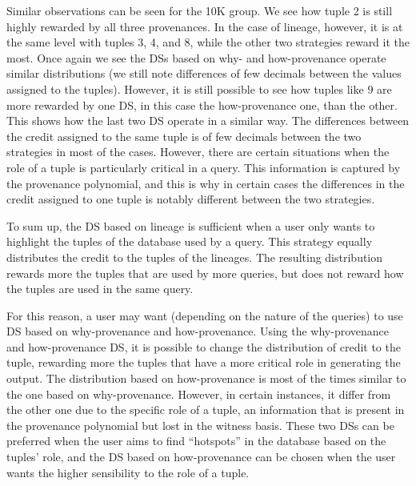 Similar observations can be seen for the 10K group. We see how tuple 2 is still highly rewarded by all three provenances. In the case of lineage, however, it is at the same level with tuples 3, 4, and 8, while the other two strategies reward it the most. 
Once again we see the DSs based on why- and how-provenance operate similar distributions (we still note differences of few decimals between the values assigned to the tuples). However, it is still possible to see how tuples like $9$ are more rewarded by one DS, in this case the how-provenance one, than the other. 
This shows how the last two DS operate in a similar way. The differences between the credit assigned to the same tuple is of few decimals between the two strategies in most of the cases. However, there are certain situations when the role of a tuple is particularly critical in a query. This information is captured by the provenance polynomial, and this is why in certain cases the differences in the credit assigned to one tuple is notably different between the two strategies.  


To sum up, the DS based on lineage is sufficient when a user only wants to highlight the tuples of the database used by a query. This strategy equally distributes the credit to the tuples of the lineages. The resulting distribution rewards more the tuples that are used by more queries, but does not reward how the tuples are used in the same query.  

For this reason, a user may want (depending on the nature of the queries) to use DS based on why-provenance and how-provenance. %
Using the why-provenance and how-provenance DS, it is possible to change the distribution of credit to the tuple, rewarding more the tuples that have a more critical role in generating the output. The distribution based on how-provenance is most of the times similar to the one based on why-provenance. 
However, in certain instances, it differ from the other one due to the specific role of a tuple, an information that is present in the provenance polynomial but lost in the witness basis. 
These two DSs can be preferred when the user aims to find ``hotspots'' in the database based on the tuples' role, and the DS based on how-provenance can be chosen when the user wants the higher sensibility to the role of a tuple. 


